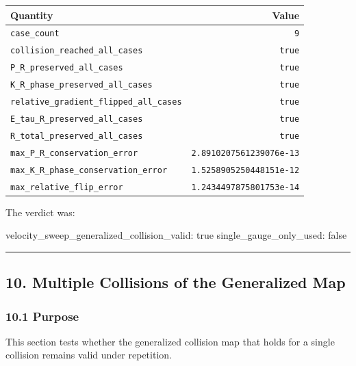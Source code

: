 \documentclass[
  a4paper,
]{article}
\newenvironment{Shaded}{}{}
\newcommand{\NormalTok}[1]{#1}
\newcounter{none} %
\begin{document}
{\def\LTcaptype{none} %
\begin{longtable}[]{@{}lr@{}}
\toprule\noalign{}
Quantity & Value \\
\midrule\noalign{}
\endhead
\bottomrule\noalign{}
\endlastfoot
\texttt{case\_count} & \texttt{9} \\
\texttt{collision\_reached\_all\_cases} & \texttt{true} \\
\texttt{P\_R\_preserved\_all\_cases} & \texttt{true} \\
\texttt{K\_R\_phase\_preserved\_all\_cases} & \texttt{true} \\
\texttt{relative\_gradient\_flipped\_all\_cases} & \texttt{true} \\
\texttt{E\_tau\_R\_preserved\_all\_cases} & \texttt{true} \\
\texttt{R\_total\_preserved\_all\_cases} & \texttt{true} \\
\texttt{max\_P\_R\_conservation\_error} &
\texttt{2.8910207561239076e-13} \\
\texttt{max\_K\_R\_phase\_conservation\_error} &
\texttt{1.5258905250448151e-12} \\
\texttt{max\_relative\_flip\_error} & \texttt{1.2434497875801753e-14} \\
\end{longtable}
}

The verdict was:

\begin{Shaded}
\begin{Highlighting}[]
\NormalTok{velocity\_sweep\_generalized\_collision\_valid: true}
\NormalTok{single\_gauge\_only\_used: false}
\end{Highlighting}
\end{Shaded}

\begin{center}\rule{0.5\linewidth}{0.5pt}\end{center}

\subsection{10. Multiple Collisions of the Generalized
Map}\label{multiple-collisions-of-the-generalized-map}

\subsubsection{10.1 Purpose}\label{purpose-1}

This section tests whether the generalized collision map that holds for
a single collision remains valid under repetition.
\end{document}
